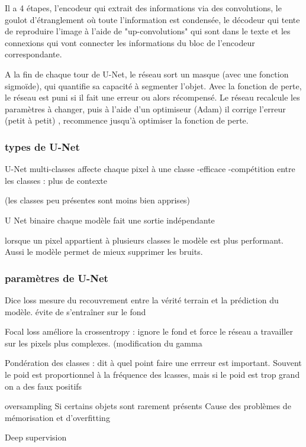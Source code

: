 \documentclass[7pt]{scrartcl}
\begin{document}
Il a 4 étapes, l'encodeur qui extrait des informations via des convolutions, le goulot d'étranglement où toute l'information est condensée, le décodeur qui tente de reproduire l'image à l'aide de "up-convolutions" qui sont dans le texte et les connexions qui vont connecter les informations du bloc de l'encodeur correspondante.  


A la fin de chaque tour de U-Net, le réseau sort un masque (avec une fonction sigmoïde), qui quantifie sa capacité à segmenter l'objet. 
Avec la fonction de perte, le réseau est puni si il fait une erreur ou alors récompensé. 
Le réseau recalcule les paramètres à changer, puis à l'aide d'un optimiseur (Adam) il corrige l'erreur (petit à petit) , recommence jusqu'à optimiser la fonction de perte. 

\subsubsection{types de U-Net}

U-Net multi-classes 
affecte chaque pixel à une classe 
-efficace 
-compétition entre les classes : plus de contexte

(les classes peu présentes sont moins bien apprises) 

U Net binaire 
chaque modèle fait une sortie indépendante 

lorsque un pixel appartient à plusieurs classes le modèle est plus performant. 
Aussi le modèle permet de mieux supprimer les bruits. 

\subsubsection{paramètres de U-Net}

Dice loss
mesure du recouvrement entre la vérité terrain et la prédiction du modèle. 
évite de s'entraîner sur le fond

Focal loss 
améliore la crossentropy : ignore le fond et force le réseau a travailler sur les pixels plus complexes. (modification du gamma

Pondération des classes 
: dit à quel point faire une errreur est important. 
Souvent le poid est proportionnel à la fréquence des lcasses, mais si le poid est trop grand on a des faux positifs 

oversampling
Si certains objets sont rarement présents  Cause des problèmes de mémorisation et d'overfitting


Deep supervision 
\end{document}
